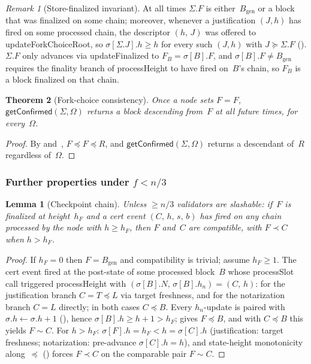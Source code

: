 \ifx\litemode\undefined\documentclass{article}\fi
\newcommand{\genesis}{\ensuremath{B_{\mathrm{gen}}}}
\newcommand{\processSlot}{\textsf{processSlot}\xspace}
\newcommand{\processHeight}{\textsf{processHeight}\xspace}
\newcommand{\updateForkChoiceRoot}{\textsf{updateForkChoiceRoot}\xspace}
\newcommand{\updateFinalized}{\textsf{updateFinalized}\xspace}
\newcommand{\getConfirmed}{\textsf{getConfirmed}\xspace}
\theoremstyle{plain}
\newtheorem{theorem}{Theorem}
\newtheorem{lemma}{Lemma}
\theoremstyle{definition}
\theoremstyle{remark}
\newtheorem{remark}[theorem]{Remark}
\begin{document}
\begin{remark}[Store-finalized invariant]\label{rem:fs-invariant}
At all times $\Sigma.F$ is either~$\genesis$ or a block that was finalized on some chain; moreover, whenever a justification $(J, h)$ has fired on some processed chain, the descriptor $(h,\, J)$ was offered to \updateForkChoiceRoot, so $\sigma[\Sigma.J].h \geq h$ for every such $(J, h)$ with $J \succeq \Sigma.F$ ().
$\Sigma.F$ only advances via \updateFinalized to $F_B = \sigma[B].F$, and $\sigma[B].F \neq \genesis$ requires the finality branch of \processHeight to have fired on~$B$'s chain, so $F_B$ is a block finalized on that chain.
\end{remark}

\begin{theorem}[Fork-choice consistency]\label{thm:fcconsistency}
Once a node sets $F = F$, $\getConfirmed(\Sigma, \Omega)$ returns a block descending from~$F$ at all future times, for every~$\Omega$.
\end{theorem}

\begin{proof}
By  and~, $F \preceq F \preceq R$, and $\getConfirmed(\Sigma, \Omega)$ returns a descendant of~$R$ regardless of~$\Omega$.
\end{proof}

\subsubsection*{Further properties under $f < n/3$}

\begin{lemma}[Checkpoint chain]\label{lem:certchain}
Unless $\geq n/3$ validators are slashable: if~$F$ is finalized at height~$h_F$ and a cert event $(C,\, h,\, s,\, b)$ has fired on any chain processed by the node with $h \geq h_F$, then $F$ and~$C$ are compatible, with $F \prec C$ when $h > h_F$.
\end{lemma}

\begin{proof}
If $h_F = 0$ then $F = \genesis$ and compatibility is trivial; assume $h_F \geq 1$.
The cert event fired at the post-state of some processed block~$B$ whose \processSlot call triggered \processHeight with $(\sigma[B].N,\, \sigma[B].h_n) = (C,\, h)$: for the justification branch $C = T \preceq L$ via target freshness, and for the notarization branch $C = L$ directly; in both cases $C \preceq B$.
Every $h_n$-update is paired with $\sigma.h \gets \sigma.h + 1$ (), hence $\sigma[B].h \geq h + 1 > h_F$;  gives $F \preceq B$, and with $C \preceq B$ this yields $F \sim C$.
For $h > h_F$: $\sigma[F].h = h_F < h = \sigma[C].h$ (justification: target freshness; notarization: pre-advance $\sigma[C].h = h$), and state-height monotonicity along~$\preceq$ () forces $F \prec C$ on the comparable pair $F \sim C$.
\end{proof}
\end{document}
